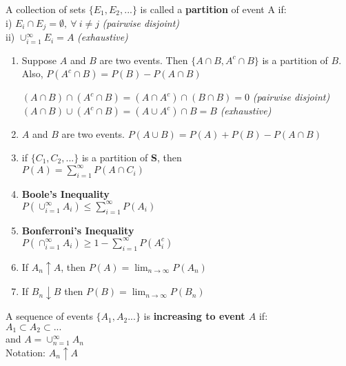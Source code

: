 \documentclass[14pt, oneside, letterpaper]{notes}
\begin{document}
%
%

\begin{mydef}
	A collection of sets $\{E_1, E_2, ...\}$ is called a \textbf{partition} 
		of event A if: \\
	\indent i) $E_i \cap E_j = \emptyset, \: \forall \: i \neq j$ 
		\textit{(pairwise disjoint)} \\
  	\indent ii) $\cup_{i=1}^{\infty}E_i = A$ 
		\textit{(exhaustive)}
\end{mydef}

\begin{enumerate}
	\item Suppose $A$ and $B$ are two events.  Then $\{A \cap B, A^c \cap B\}$
	is a partition of $B$.  Also, $P(A^c \cap B) = P(B) - P(A \cap B)$ 

	\begin{myproof}
		$(A \cap B) \cap (A^c \cap B) = 
		(A \cap A^c) \cap (B \cap B) = 0$  \textit{(pairwise disjoint)} \\
		$(A \cap B) \cup (A^c \cap B) = (A \cup A^c) \cap B = B $ 
		\textit{(exhaustive)} 
	\end{myproof}

	\item $A$ and $B$ are two events.  $P(A \cup B) = P(A) + P(B) - P(A \cap B)$ \\

	\item if $\{C_1, C_2, ... \}$ is a partition of \textbf{S}, then \\
	$P(A) = \sum_{i=1}^{\infty} P(A \cap C_i)$ 

	\item\textbf{Boole's Inequality} \\
	\indent $P(\cup_{i=1}^{\infty} A_i) \leq \sum_{i=1}^{\infty}P(A_i)$ 
	
	\item \textbf{Bonferroni's Inequality}\\
	$P(\cap_{i=1}^{\infty} A_i) \geq 1 - \sum_{i=1}^{\infty} P(A_i^c)$

	\item If $A_n \uparrow A$, then $P(A) = \lim_{n \to \infty} P(A_n)$ 

	\item If $B_n \downarrow B$ then $P(B) = \lim_{n \to \infty} P(B_n)$ 
\end{enumerate}

\begin{mydef}
	A sequence of events $\{A_1, A_2 ...\}$ is \textbf{increasing to event $A$} if: \\
	\indent $A_1 \subset A_2 \subset ...$  \\
	\indent and $A = \cup_{n=1}^{\infty} A_n$ \\
	\indent Notation: $A_n \uparrow A$
\end{mydef}
\end{document}

